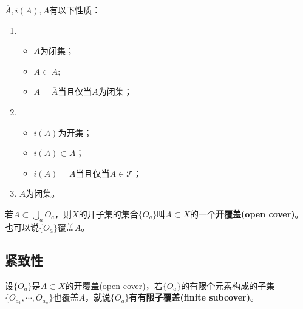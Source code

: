 \documentclass[a4paper]{article}
\begin{document}
\begin{nthm}
    $ \overline{A}, i(A), \dot{A} $有以下性质：
    \begin{enumerate}
        \item \begin{itemize}
                  \item $ \overline{A} $为闭集；
                  \item $ A \subset \overline{A} $;
                  \item $ A = \overline{A} $当且仅当$ A $为闭集；
              \end{itemize}
        \item \begin{itemize}
                  \item $ i(A) $为开集；
                  \item $ i(A) \subset A $；
                  \item $ i(A) = A $当且仅当$ A \in \mathcal{T} $；
              \end{itemize}
        \item $ \dot{A} $为闭集。
    \end{enumerate}
\end{nthm}

\begin{ndefi}
    若$ A \subset \bigcup_{a} O_{a} $，则$ X $的开子集的集合$ \{ O_{a} \} $叫$ A \subset X $的一个\textbf{开覆盖(open cover)}。也可以说$ \{ O_{a} \} $覆盖$ A $。
\end{ndefi}

\subsection{紧致性}

\begin{ndefi}
    设$ \{ O_{a} \} $是$ A \subset X $的开覆盖(open cover)，若$ \{ O_{a} \} $的有限个元素构成的子集$ \{ O_{a_{1}}, \cdots, O_{a_{n}} \} $也覆盖$ A $，就说$ \{ O_{a} \} $有\textbf{有限子覆盖(finite subcover)}。
\end{ndefi}
\end{document}
